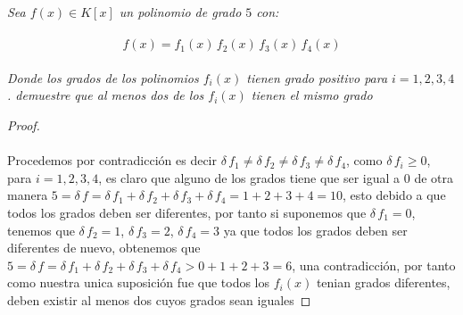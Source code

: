 \documentclass[11pt,letterpaper]{article}
\begin{document}
\begin{tcolorbox}[
	title = \textcolor{black}{\textcolor{white}{Problema 2}},]
\textit{Sea $f(x)\in K[x]$ un polinomio de grado $5$ con:\,\\
\,\\
\begin{equation*}
    f(x)=f_1(x)\,f_2(x)\,f_3(x)\,f_4(x)
\end{equation*}\,\\
Donde los grados de los polinomios $f_i(x)$ tienen grado positivo para $i=1,2,3,4$. demuestre que al menos 
dos de los $f_i(x)$ tienen el mismo grado
}
\end{tcolorbox}
\begin{proof}\,\\
    \,\\
    Procedemos por contradicci\'on es decir $\delta\,f_1\neq\delta\,f_2\neq\delta\,f_3\neq\delta\,f_4$, como $\delta\,f_i\geq 0$, para $i=1,2,3,4$, es claro que
    alguno de los grados tiene que ser igual a $0$ de otra manera $5=\delta\,f=\delta\,f_1+\delta\,f_2+\delta\,f_3+\delta\,f_4=1+2+3+4=10$, esto debido a que todos los
    grados deben ser diferentes, por tanto si suponemos que $\delta\,f_1=0$, tenemos que $\delta\,f_2=1$, $\delta\,f_3=2$, $\delta\,f_4=3$ ya que todos los grados
    deben ser diferentes de nuevo, obtenemos que $5=\delta\,f=\delta\,f_1+\delta\,f_2+\delta\,f_3+\delta\,f_4>0+1+2+3=6$, una contradicci\'on, por tanto como nuestra unica suposici\'on fue que
    todos los $f_i(x)$ tenian grados diferentes, deben existir al menos dos cuyos grados sean iguales
\end{proof}\,\\
\end{document}

